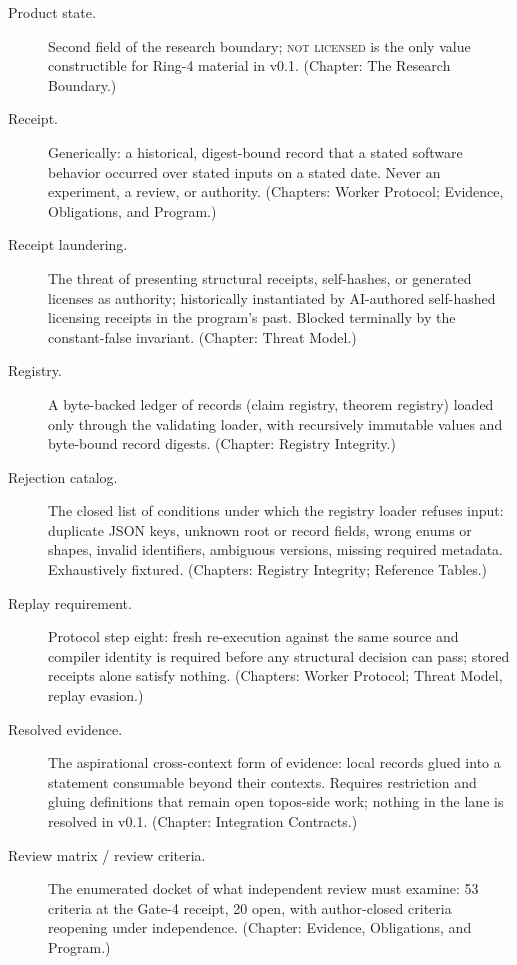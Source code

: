 \begin{description}
\item[Product state.] Second field of the research boundary; \textsc{not licensed} is the only value constructible for Ring-4 material in v0.1. (Chapter: The Research Boundary.)

\item[Receipt.] Generically: a historical, digest-bound record that a stated software behavior occurred over stated inputs on a stated date. Never an experiment, a review, or authority. (Chapters: Worker Protocol; Evidence, Obligations, and Program.)

\item[Receipt laundering.] The threat of presenting structural receipts, self-hashes, or generated licenses as authority; historically instantiated by AI-authored self-hashed licensing receipts in the program's past. Blocked terminally by the constant-false invariant. (Chapter: Threat Model.)

\item[Registry.] A byte-backed ledger of records (claim registry, theorem registry) loaded only through the validating loader, with recursively immutable values and byte-bound record digests. (Chapter: Registry Integrity.)

\item[Rejection catalog.] The closed list of conditions under which the registry loader refuses input: duplicate JSON keys, unknown root or record fields, wrong enums or shapes, invalid identifiers, ambiguous versions, missing required metadata. Exhaustively fixtured. (Chapters: Registry Integrity; Reference Tables.)

\item[Replay requirement.] Protocol step eight: fresh re-execution against the same source and compiler identity is required before any structural decision can pass; stored receipts alone satisfy nothing. (Chapters: Worker Protocol; Threat Model, replay evasion.)

\item[Resolved evidence.] The aspirational cross-context form of evidence: local records glued into a statement consumable beyond their contexts. Requires restriction and gluing definitions that remain open topos-side work; nothing in the lane is resolved in v0.1. (Chapter: Integration Contracts.)

\item[Review matrix / review criteria.] The enumerated docket of what independent review must examine: 53 criteria at the Gate-4 receipt, 20 open, with author-closed criteria reopening under independence. (Chapter: Evidence, Obligations, and Program.)


\end{description}
